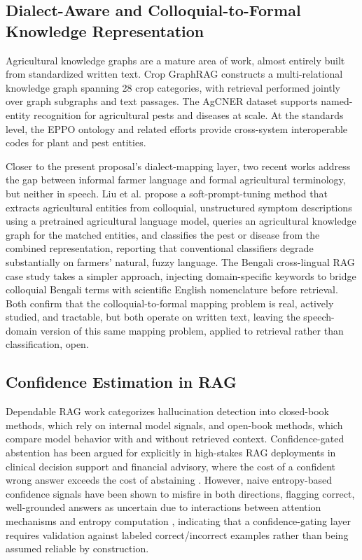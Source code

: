 \documentclass[conference]{IEEEtran}
\begin{document}
\subsection{Dialect-Aware and Colloquial-to-Formal Knowledge Representation}

Agricultural knowledge graphs are a mature area of work, almost entirely built from standardized written text. Crop GraphRAG \cite{wu2026cropgraphrag} constructs a multi-relational knowledge graph spanning 28 crop categories, with retrieval performed jointly over graph subgraphs and text passages. The AgCNER dataset \cite{yao2024agcner} supports named-entity recognition for agricultural pests and diseases at scale. At the standards level, the EPPO ontology and related efforts \cite{kgeditorial2023} provide cross-system interoperable codes for plant and pest entities.

Closer to the present proposal's dialect-mapping layer, two recent works address the gap between informal farmer language and formal agricultural terminology, but neither in speech. Liu et al. \cite{liu2025colloquialpest} propose a soft-prompt-tuning method that extracts agricultural entities from colloquial, unstructured symptom descriptions using a pretrained agricultural language model, queries an agricultural knowledge graph for the matched entities, and classifies the pest or disease from the combined representation, reporting that conventional classifiers degrade substantially on farmers' natural, fuzzy language. The Bengali cross-lingual RAG case study \cite{hossain2026bengalirag} takes a simpler approach, injecting domain-specific keywords to bridge colloquial Bengali terms with scientific English nomenclature before retrieval. Both confirm that the colloquial-to-formal mapping problem is real, actively studied, and tractable, but both operate on written text, leaving the speech-domain version of this same mapping problem, applied to retrieval rather than classification, open.

\subsection{Confidence Estimation in RAG}

Dependable RAG work \cite{dependablerag2026} categorizes hallucination detection into closed-book methods, which rely on internal model signals, and open-book methods, which compare model behavior with and without retrieved context. Confidence-gated abstention has been argued for explicitly in high-stakes RAG deployments in clinical decision support and financial advisory, where the cost of a confident wrong answer exceeds the cost of abstaining \cite{abstinence2025}. However, naive entropy-based confidence signals have been shown to misfire in both directions, flagging correct, well-grounded answers as uncertain due to interactions between attention mechanisms and entropy computation \cite{intrygue2026}, indicating that a confidence-gating layer requires validation against labeled correct/incorrect examples rather than being assumed reliable by construction.
\end{document}
